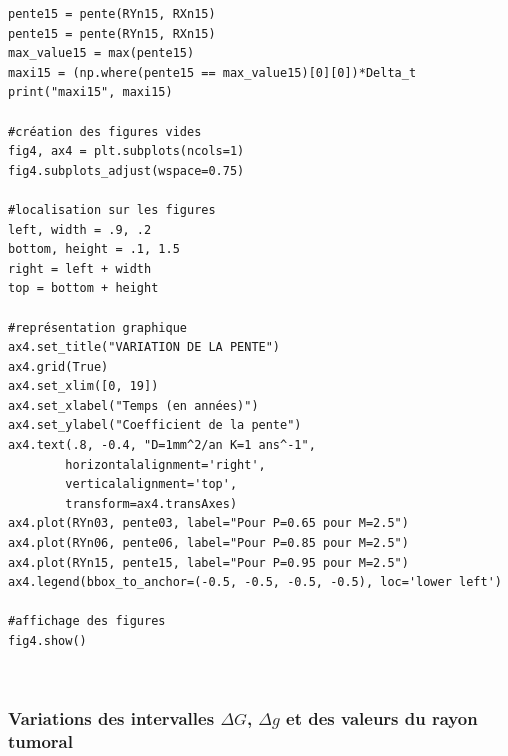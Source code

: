 \documentclass[12pt,a4paper]{article}
\begin{document}
\begin{lstlisting}[style=stylepython]
pente15 = pente(RYn15, RXn15)
pente15 = pente(RYn15, RXn15)
max_value15 = max(pente15)
maxi15 = (np.where(pente15 == max_value15)[0][0])*Delta_t
print("maxi15", maxi15)

#création des figures vides 
fig4, ax4 = plt.subplots(ncols=1)
fig4.subplots_adjust(wspace=0.75)

#localisation sur les figures 
left, width = .9, .2
bottom, height = .1, 1.5
right = left + width
top = bottom + height

#représentation graphique 
ax4.set_title("VARIATION DE LA PENTE")
ax4.grid(True)
ax4.set_xlim([0, 19])
ax4.set_xlabel("Temps (en années)")
ax4.set_ylabel("Coefficient de la pente")
ax4.text(.8, -0.4, "D=1mm^2/an K=1 ans^-1",
        horizontalalignment='right',
        verticalalignment='top',
        transform=ax4.transAxes)
ax4.plot(RYn03, pente03, label="Pour P=0.65 pour M=2.5")
ax4.plot(RYn06, pente06, label="Pour P=0.85 pour M=2.5")
ax4.plot(RYn15, pente15, label="Pour P=0.95 pour M=2.5")
ax4.legend(bbox_to_anchor=(-0.5, -0.5, -0.5, -0.5), loc='lower left')

#affichage des figures 
fig4.show()
\end{lstlisting}
\\
\newpage
\subsubsection{Variations des intervalles $\Delta G$, $\Delta g$ et des valeurs du rayon tumoral}
\\
\end{document}
